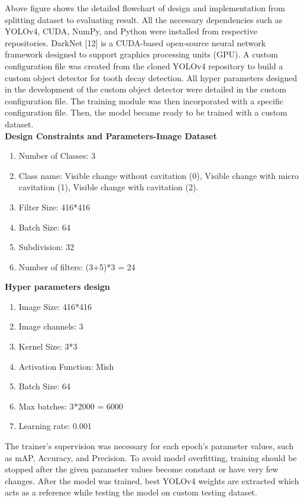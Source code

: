 Above figure shows the detailed flowchart of design and implementation from splitting dataset to evaluating result. All the necessary dependencies such as YOLOv4, CUDA, NumPy, and Python were installed from respective repositories. DarkNet [12] is a CUDA-based open-source neural network framework designed to support graphics processing units (GPU). A custom configuration file was created from the cloned YOLOv4 repository to build a custom object detector for tooth decay detection. All hyper parameters designed in the development of the custom object detector were detailed in the custom configuration file. The training module was then incorporated with a specific configuration file. Then, the model became ready to be trained with a custom dataset.\\
\textbf{Design Constraints and Parameters-Image Dataset}
\begin{enumerate}
    \item Number of Classes: 3
    \item Class name: Visible change without cavitation (0), Visible change with micro cavitation (1), Visible change with cavitation (2).
    \item Filter Size: 416*416
    \item Batch Size: 64
    \item Subdivision: 32
    \item Number of filters: (3+5)*3 = 24
\end{enumerate}
\textbf{Hyper parameters design}
\begin{enumerate}
    \item Image Size: 416*416
    \item Image channels: 3
    \item Kernel Size: 3*3
    \item Activation Function: Mish
    \item Batch Size: 64
    \item Max batches: 3*2000 = 6000
    \item Learning rate: 0.001
\end{enumerate}
The trainer's supervision was necessary for each epoch's parameter values, such as mAP, Accuracy, and Precision. To avoid model overfitting, training should be stopped after the given parameter values become constant or have very few changes. After the model was trained, best YOLOv4 weights are extracted which acts as a reference while testing the model on custom testing dataset. 
